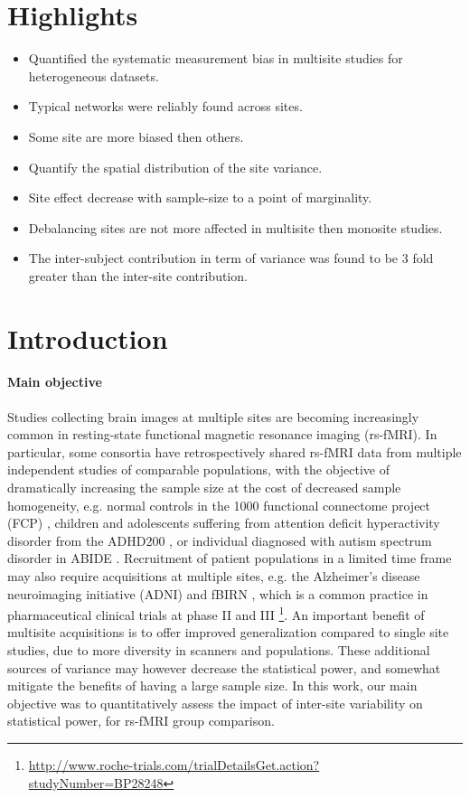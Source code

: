 \documentclass[authoryear]{elsarticle}
\begin{document}

\section*{Highlights}

\begin{itemize}
\item Quantified the systematic measurement bias in multisite studies for heterogeneous datasets. 
\item Typical networks were reliably found across sites.
\item Some site are more biased then others.
\item Quantify the spatial distribution of the site variance.
\item Site effect decrease with sample-size to a point of marginality.
\item Debalancing sites are not more affected in multisite then monosite studies.
\item The inter-subject contribution in term of variance was found to be 3 fold greater than the inter-site contribution.
\end{itemize}

\section{Introduction}

\paragraph{Main objective}
Studies collecting brain images at multiple sites are becoming increasingly common in resting-state functional magnetic resonance imaging (rs-fMRI). In particular, some consortia have retrospectively shared rs-fMRI data from multiple independent studies of comparable populations, with the objective of dramatically increasing the sample size at the cost of decreased sample homogeneity, e.g. normal controls in the 1000 functional connectome project (FCP) \citep{Biswal2010}, children and adolescents suffering from attention deficit hyperactivity disorder from the ADHD200 \citep{ADHD200,Fair2012}, or individual diagnosed with autism spectrum disorder in ABIDE \citep{Nielsen2013}. Recruitment of patient populations in a limited time frame may also require acquisitions at multiple sites, e.g. the Alzheimer’s disease neuroimaging initiative (ADNI) \citep{Mueller2005} and fBIRN \citep{Friedman2006,Friedman2006a}, which is a common practice in pharmaceutical clinical trials at phase II and III \footnote{\url{http://www.roche-trials.com/trialDetailsGet.action?studyNumber=BP28248}}. An important benefit of multisite acquisitions is to offer improved generalization compared to single site studies, due to more diversity in scanners and populations. These additional sources of variance may however decrease the statistical power, and somewhat mitigate the benefits of having a large sample size. In this work, our main objective was to quantitatively assess the impact of inter-site variability on statistical power, for rs-fMRI group comparison.
\end{document}

